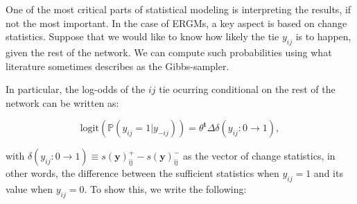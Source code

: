 \documentclass[]{book}
\begin{document}
One of the most critical parts of statistical modeling is interpreting the results,
if not the most important. In the case of ERGMs, a key aspect is based on change
statistics. Suppose that we would like to know how likely the tie \(y_{ij}\) is to
happen, given the rest of the network. We can compute such probabilities using what
literature sometimes describes as the Gibbs-sampler.

In particular, the log-odds of the \(ij\) tie ocurring conditional on the rest of
the network can be written as:

\newcommand{\sufstats}[1]{s\left(#1\right)}
\renewcommand{\exp}[1]{\mbox{exp}\left\{#1\right\}}
\renewcommand{\log}[1]{\mbox{log}\left\{#1\right\}}
\newcommand{\transpose}[1]{{#1}^\mathbf{t}}
\renewcommand{\t}[1]{\transpose{#1}}

\newcommand{\s}[1]{\sufstats{#1}}
\newcommand{\SUFF}{\mathcal{S}}
\newcommand{\Suff}{\mathbf{S}}
\newcommand{\suff}{\mathbf{s}}

\newcommand{\isone}[1]{{\boldsymbol{1}\left( #1 \right)}}
\renewcommand{\Pr}[1]{{\mathbb{P}\left(#1\right) }}
\newcommand{\f}[1]{{f\left(#1\right) }}
\newcommand{\Prcond}[2]{{\mathbb{P}\left(#1\vphantom{#2}\;\right|\left.\vphantom{#1}#2\right)}}
\newcommand{\fcond}[2]{{f\left(#1|#2\right) }}
\newcommand{\Expected}[1]{{\mathbb{E}\left\{#1\right\}}}
\newcommand{\ExpectedCond}[2]{{\mathbb{E}\left\{#1\vphantom{#2}\right|\left.\vphantom{#1}#2\right\}}}
\renewcommand{\exp}[1]{\mbox{exp}\left\{#1\right\}}

\newcommand{\Likelihood}[2]{\text{L}\left(#1 \left|\vphantom{#1}#2\right.\right)}

\newcommand{\loglik}[1]{l\left(#1\right)}
\newcommand{\logit}[1]{\mbox{logit}\left(#1\right)}
\newcommand{\chng}[1]{\delta\left(y_{#1}:0\to1\right)}

\newcommand{\pgraph}{\mathbf{x}}
\newcommand{\snamed}[2]{\s{#1}_{\mbox{#2}}}

\begin{equation}
    \mbox{logit}\left({\mathbb{P}\left(y_{ij} = 1|y_{-ij}\right) }\right) = {\theta}^\mathbf{t}\Delta\delta\left(y_{ij}:0\to 1\right),
\end{equation}

\noindent with \(\delta\left(y_{ij}:0\to 1\right)\equiv s\left(\mathbf{y}\right)_{\mbox{ij}}^+ - s\left(\mathbf{y}\right)_{\mbox{ij}}^-\) as
the vector of change statistics, in other words, the difference between the
sufficient statistics when \(y_{ij}=1\) and its value when \(y_{ij} = 0\). To show
this, we write the following:
\end{document}
